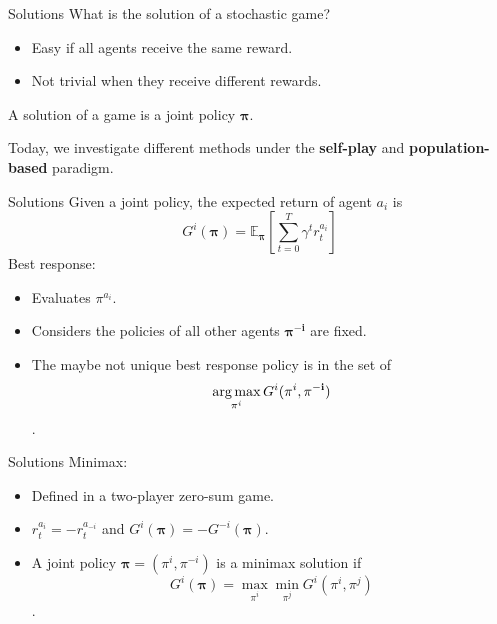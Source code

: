 \documentclass[9pt, hyperref={pdfusetitle,colorlinks=true,allcolors=DarkBlue}]{beamer}
\begin{document}
\begin{frame}{Solutions}
\vfill
What is the solution of a stochastic game?
\begin{itemize}
    \item Easy if all agents receive the same reward.
    \item Not trivial when they receive different rewards.
\end{itemize}
A solution of a game is a joint policy $\mathbf{\pi}$.

\vfill

Today, we investigate different methods under the \textbf{self-play} and \textbf{population-based} paradigm.
\end{frame}
\begin{frame}{Solutions}
Given a joint policy, the expected return of agent $a_i$ is $$G^i(\mathbf{\pi}) = \mathbb{E}_{\mathbf{\pi}}\left[ \sum_{t=0}^T \gamma^t r^{a_i}_t \right]$$
Best response: 
\begin{itemize}
    \item Evaluates $\pi^{a_i}$.
    \item Considers the policies of all other agents $\mathbf{\pi^{-i}}$ are fixed.
    \item The maybe not unique best response policy is in the set of $$\operatorname*{arg\,max}_{\pi^{i}} G^i (\pi^{i}, \mathbf{\pi^{-i}})$$.
\end{itemize}
\vfill
\end{frame}
\begin{frame}{Solutions}
\vfill
Minimax:
\begin{itemize}
    \item Defined in a two-player zero-sum game.
    \item $r_t^{a_i} = -r_t^{a_{-i}}$ and $G^i(\mathbf{\pi}) = - G^{-i}(\mathbf{\pi})$.
    \item A joint policy $\mathbf{\pi} = (\pi^i, \pi^{-i})$ is a minimax solution if $$G^i(\mathbf{\pi})=\max_{\pi^i} \min_{\pi^j} G^i(\pi^i, \pi^j)$$.
\end{itemize}
\vfill
\end{frame}
\end{document}
